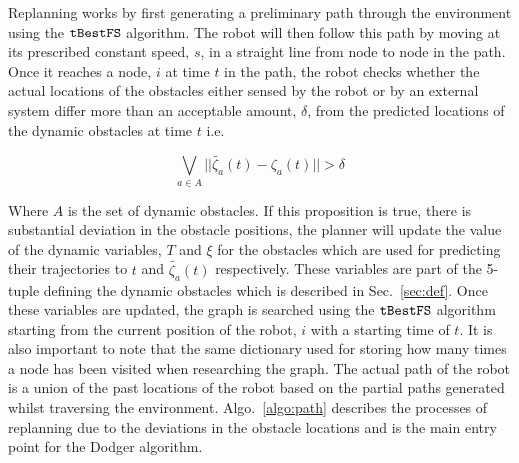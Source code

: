 Replanning works by first generating a preliminary path through the environment
using the $\Acronym{tBestFS}$ algorithm. The robot will then follow this path
by moving at its prescribed constant speed, $s$, in a straight line from node
to node in the path. Once it reaches a node, $i$ at time $t$ in the path, the
robot checks whether the actual locations of the obstacles either sensed by the
robot or by an external system differ more than an acceptable amount, $\delta$,
from the predicted locations of the dynamic obstacles at time $t$ i.e.

$$\bigvee_{a \in A} ||\tilde{\zeta_a}(t) - \zeta_a(t)|| > \delta$$

Where $A$ is the set of dynamic obstacles. If this proposition is true, there
is substantial deviation in the obstacle positions, the planner will update the
value of the dynamic variables, $T$ and $\xi$ for the obstacles which are used
for predicting their trajectories to $t$ and $\tilde{\zeta_a}(t)$ respectively.
These variables are part of the 5-tuple defining the dynamic obstacles which is
described in Sec.~\ref{sec:def}. Once these variables are updated, the graph is
searched using the $\Acronym{tBestFS}$ algorithm starting from the current
position of the robot, $i$ with a starting time of $t$. It is also important to
note that the same dictionary used for storing how many times a node has been
visited when researching the graph. The actual path of the robot is a union of
the past locations of the robot based on the partial paths generated whilst
traversing the environment. Algo.~\ref{algo:path} describes the processes of
replanning due to the deviations in the obstacle locations and is the main
entry point for the Dodger algorithm.

